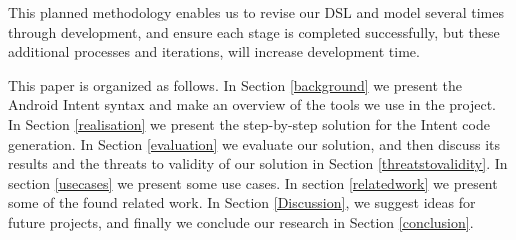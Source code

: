 This planned methodology enables us to revise our DSL and model several times through development, and ensure each stage is completed successfully, but these additional processes and iterations, will increase development time.



This paper is organized as follows. In Section \ref{background} we present the Android Intent syntax and make an overview of the tools we use in the project. In Section \ref{realisation} we present the step-by-step solution for the Intent code generation. In Section \ref{evaluation} we evaluate our solution, and then discuss its results and the threats to validity of our solution in Section \ref{threatstovalidity}. In section \ref{usecases} we present some use cases. In section \ref{relatedwork} we present some of the found related work. In Section \ref{Discussion}, we suggest ideas for future projects, and finally we conclude our research in Section \ref{conclusion}.